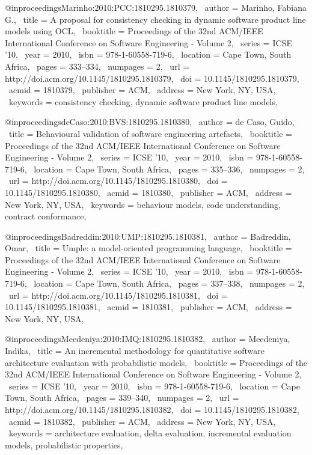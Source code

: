 @inproceedings{Marinho:2010:PCC:1810295.1810379,
 author = {Marinho, Fabiana G.},
 title = {A proposal for consistency checking in dynamic software product line models using OCL},
 booktitle = {Proceedings of the 32nd ACM/IEEE International Conference on Software Engineering - Volume 2},
 series = {ICSE '10},
 year = {2010},
 isbn = {978-1-60558-719-6},
 location = {Cape Town, South Africa},
 pages = {333--334},
 numpages = {2},
 url = {http://doi.acm.org/10.1145/1810295.1810379},
 doi = {10.1145/1810295.1810379},
 acmid = {1810379},
 publisher = {ACM},
 address = {New York, NY, USA},
 keywords = {consistency checking, dynamic software product line models},
} 

@inproceedings{deCaso:2010:BVS:1810295.1810380,
 author = {de Caso, Guido},
 title = {Behavioural validation of software engineering artefacts},
 booktitle = {Proceedings of the 32nd ACM/IEEE International Conference on Software Engineering - Volume 2},
 series = {ICSE '10},
 year = {2010},
 isbn = {978-1-60558-719-6},
 location = {Cape Town, South Africa},
 pages = {335--336},
 numpages = {2},
 url = {http://doi.acm.org/10.1145/1810295.1810380},
 doi = {10.1145/1810295.1810380},
 acmid = {1810380},
 publisher = {ACM},
 address = {New York, NY, USA},
 keywords = {behaviour models, code understanding, contract conformance},
} 

@inproceedings{Badreddin:2010:UMP:1810295.1810381,
 author = {Badreddin, Omar},
 title = {Umple: a model-oriented programming language},
 booktitle = {Proceedings of the 32nd ACM/IEEE International Conference on Software Engineering - Volume 2},
 series = {ICSE '10},
 year = {2010},
 isbn = {978-1-60558-719-6},
 location = {Cape Town, South Africa},
 pages = {337--338},
 numpages = {2},
 url = {http://doi.acm.org/10.1145/1810295.1810381},
 doi = {10.1145/1810295.1810381},
 acmid = {1810381},
 publisher = {ACM},
 address = {New York, NY, USA},
} 

@inproceedings{Meedeniya:2010:IMQ:1810295.1810382,
 author = {Meedeniya, Indika},
 title = {An incremental methodology for quantitative software architecture evaluation with probabilistic models},
 booktitle = {Proceedings of the 32nd ACM/IEEE International Conference on Software Engineering - Volume 2},
 series = {ICSE '10},
 year = {2010},
 isbn = {978-1-60558-719-6},
 location = {Cape Town, South Africa},
 pages = {339--340},
 numpages = {2},
 url = {http://doi.acm.org/10.1145/1810295.1810382},
 doi = {10.1145/1810295.1810382},
 acmid = {1810382},
 publisher = {ACM},
 address = {New York, NY, USA},
 keywords = {architecture evaluation, delta evaluation, incremental evaluation models, probabilistic properties},
} 

